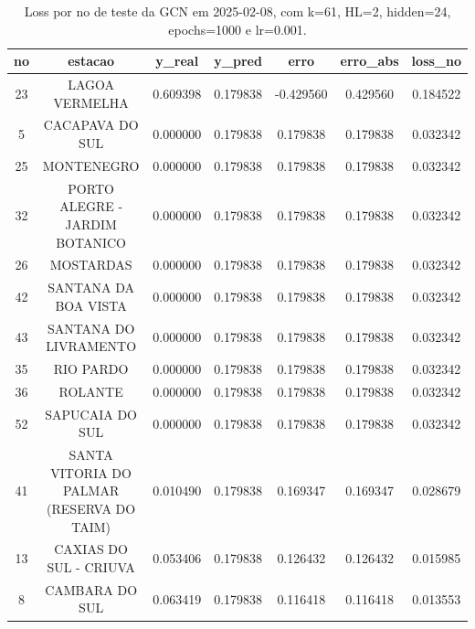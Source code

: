 \begin{table}[h]
\centering
\caption{Loss por no de teste da GCN em 2025-02-08, com k=61, HL=2, hidden=24, epochs=1000 e lr=0.001.}
\label{tab:gcn_loss_k61_hl2_h24_e1000_d20250208}
\begin{tabular}{ccccccc}
\toprule
no & estacao & y\_real & y\_pred & erro & erro\_abs & loss\_no \\
\midrule
23 & LAGOA VERMELHA & 0.609398 & 0.179838 & -0.429560 & 0.429560 & 0.184522 \\
5 & CACAPAVA DO SUL & 0.000000 & 0.179838 & 0.179838 & 0.179838 & 0.032342 \\
25 & MONTENEGRO & 0.000000 & 0.179838 & 0.179838 & 0.179838 & 0.032342 \\
32 & PORTO ALEGRE - JARDIM BOTANICO & 0.000000 & 0.179838 & 0.179838 & 0.179838 & 0.032342 \\
26 & MOSTARDAS & 0.000000 & 0.179838 & 0.179838 & 0.179838 & 0.032342 \\
42 & SANTANA DA BOA VISTA & 0.000000 & 0.179838 & 0.179838 & 0.179838 & 0.032342 \\
43 & SANTANA DO LIVRAMENTO & 0.000000 & 0.179838 & 0.179838 & 0.179838 & 0.032342 \\
35 & RIO PARDO & 0.000000 & 0.179838 & 0.179838 & 0.179838 & 0.032342 \\
36 & ROLANTE & 0.000000 & 0.179838 & 0.179838 & 0.179838 & 0.032342 \\
52 & SAPUCAIA DO SUL & 0.000000 & 0.179838 & 0.179838 & 0.179838 & 0.032342 \\
41 & SANTA VITORIA DO PALMAR (RESERVA DO TAIM) & 0.010490 & 0.179838 & 0.169347 & 0.169347 & 0.028679 \\
13 & CAXIAS DO SUL - CRIUVA & 0.053406 & 0.179838 & 0.126432 & 0.126432 & 0.015985 \\
8 & CAMBARA DO SUL & 0.063419 & 0.179838 & 0.116418 & 0.116418 & 0.013553 \\
\bottomrule
\end{tabular}
\end{table}
